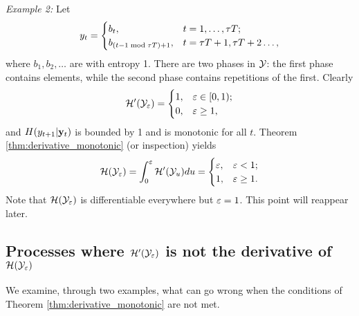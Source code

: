 \documentclass[12pt, draftclsnofoot,journal,onecolumn]{IEEEtran}
\begin{document}
{\noindent
{\em Example 2:} Let
\begin{equation}
    y_{t} = \begin{cases} 
      b_t, & t=1,\ldots,{\tau T}; \\
      b_{(t-1\bmod{\tau T})+1}, & t={\tau T}+1,{\tau T}+2\ldots,
      \end{cases}
      \label{eq:repetition_eg}
\end{equation}
where $b_{1},b_{2},\ldots$ are \iid with entropy 1. There are two phases in $\mathcal{Y}$: the first phase contains \iid elements, while the second phase contains repetitions of the first.  Clearly
\begin{equation}
    {\mathcal{H}{'}}({\mathcal{Y}}_{\varepsilon})  = \begin{cases} 
      1, & \varepsilon \in[0,1); \\
      0, & \varepsilon \geq 1,
      \end{cases}
\end{equation}
and $H(y_{t+1}|{\mathbf{y}}_{t})$ is bounded by 1 and is monotonic for all $t$.
Theorem \ref{thm:derivative_monotonic} (or inspection) yields
\begin{align*}
    \mathcal{H}(\mathcal{Y}_\varepsilon)= \int_{0}^{\varepsilon}{\mathcal{H}{'}}({\mathcal{Y}}_{u}) du=\begin{cases} 
      \varepsilon, & \varepsilon<1; \\
      1, & \varepsilon\geq 1.
      \end{cases}
\end{align*}
Note that $\mathcal{H}(\mathcal{Y}_\varepsilon)$ is differentiable everywhere but $\varepsilon=1$.  This point will reappear later.


\subsection{Processes where ${\mathcal{H}{'}}(\mathcal{Y}_\varepsilon)$ is not the derivative of $\mathcal{H}(\mathcal{Y}_\varepsilon)$}
\label{sec:general_scalar_process}
We examine, through two examples, what can go wrong when the conditions of Theorem \ref{thm:derivative_monotonic}  are not met.

}
\end{document}

